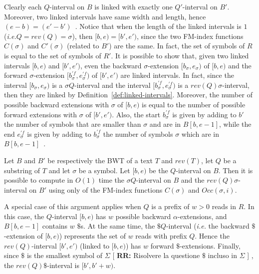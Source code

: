 \documentclass[runningheads,envcountsame,a4paper]{llncs}
\newcommand{\notaestesa}[2]{%
 \marginpar{\color{red!75!black}\textbf{\texttimes}}%
 {\color{red!75!black}%
 [\,\textbullet\,\textsf{\textbf{#1:}} %
 \textsf{\footnotesize#2}\,\textbullet\,]}%
}
\newcommand{\ie}{\textit{i.e.}\xspace}
\begin{document}
Clearly each $Q$-interval on $B$ is linked with exactly one $Q'$-interval on $B'$.
Moreover, two linked intervals have same width and length, hence $(e-b)=(e'-b')$~\cite{Lam2009,Simpson2010}.
Notice that when the length of the linked intervals is $1$ (\ie $Q=rev(Q)=\sigma$), then $[b,e)=[b',e')$,
since the two FM-index functions $C(\sigma)$ and $C'(\sigma)$ (related to $B'$) are the same.
In fact, the set of symbols of $R$ is equal to the set of symbols of $R'$.
It is possible to show that, given two linked intervals $[b,e)$ and $[b',e')$, even the backward $\sigma$-extension $[b_{\sigma},e_{\sigma})$ of $[b,e)$ and the forward $\sigma$-extension $[b^{'f}_{\sigma},e^{'f}_{\sigma})$ of $[b',e')$ are linked intervals.
In fact, since the interval $[b_{\sigma},e_{\sigma})$ is a $\sigma Q$-interval and the interval $[b^{'f}_{\sigma},e^{'f}_{\sigma})$ is a $rev(Q) \sigma$-interval, then they are linked by Definition~\ref{def:linked-intervals}.
Moreover, the number of possible backward extensions with $\sigma$ of $[b,e)$ is equal to the number of possible forward extensions with $\sigma$ of $[b',e')$.
Also,  the start $b^{'f}_{\sigma}$ is given by adding to $b'$ the number of symbols that are smaller than $\sigma$ and are in $B[b,e-1]$,
while the end $e^{'f}_{\sigma}$ is given by adding to $b^{'f}_{\sigma}$ the number of symbols $\sigma$ which are in $B[b,e-1]$~\cite{Simpson2010}.

\begin{proposition}
\label{proposition:linked-intervals}
Let $B$ and $B'$ be respectively the BWT of a text $T$ and $rev(T)$, let $Q$ be a substring of $T$ and let $\sigma$ be a symbol.
Let $[b,e)$ be the $Q$-interval on $B$.
Then it is possible to compute in $O(1)$ time the $\sigma Q$-interval on $B$ and the $rev(Q) \sigma$-interval on $B'$
using only of the FM-index functions $C(\sigma)$ and $Occ(\sigma, i)$.
\end{proposition}

A special case of this argument applies when
$Q$ is a prefix of $w > 0$ reads in $R$.
In this case, the $Q$-interval $[b,e)$ has $w$ possible backward $\alpha$-extensions, and  $B[b,e-1]$ contains $w$ $\$$s.
At the same time, the $\$ Q$-interval (\ie the backward $\$$-extension of $[b,e)$) represents the set of $w$ reads with prefix $Q$.
Hence the $rev(Q)$-interval $[b',e')$ (linked to $[b,e)$) has $w$ forward $\$$-extensions.
Finally, since $\$$ is the smallest symbol of $\Sigma$ \notaestesa{RR}{Risolvere la questione $\$$ incluso in $\Sigma$}, the $rev(Q) \$$-interval is $[b',b'+w)$.
\end{document}
